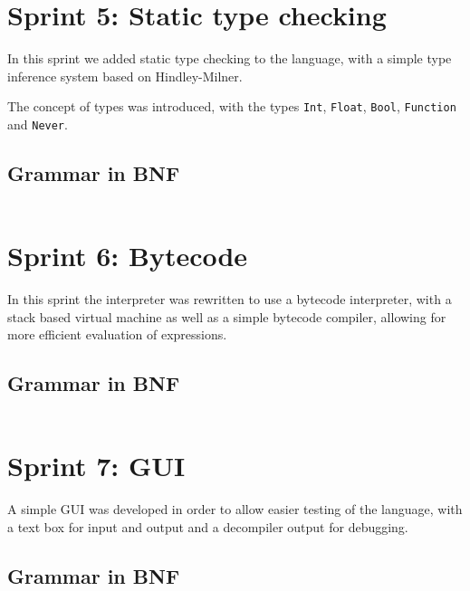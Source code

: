 \section{Sprint 5: Static type checking}\label{sec:static-type-checking}

In this sprint we added static type checking to the language, with a simple type inference system based on 
Hindley-Milner.

The concept of types was introduced, with the types \texttt{Int}, \texttt{Float}, \texttt{Bool}, \texttt{Function} and
\texttt{Never}.

\subsection{Grammar in BNF}\label{subsec:grammar-in-bnf5}

\begin{verbatim}
\end{verbatim}

\section{Sprint 6: Bytecode}\label{sec:bytecode}

In this sprint the interpreter was rewritten to use a bytecode interpreter, with a stack based virtual machine as 
well as a simple bytecode compiler, allowing for more efficient evaluation of expressions.

\subsection{Grammar in BNF}\label{subsec:grammar-in-bnf6}

\begin{verbatim}
\end{verbatim}

\section{Sprint 7: GUI}\label{sec:gui}

A simple GUI was developed in order to allow easier testing of the language, with a text box for input and output and a 
decompiler output for debugging.

\subsection{Grammar in BNF}\label{subsec:grammar-in-bnf7}

